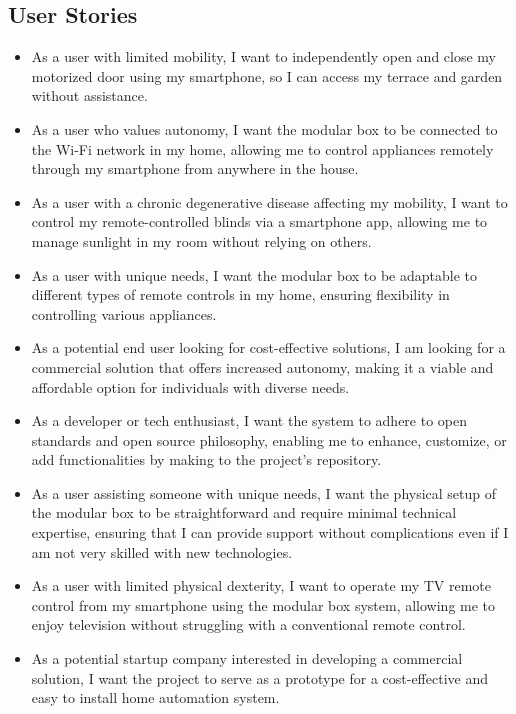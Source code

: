 \subsection{User Stories}

\begin{itemize}
    \item As a user with limited mobility, I want to independently open and close my motorized door using my smartphone, so I can access my terrace and garden without assistance.
    \item As a user who values autonomy, I want the modular box to be connected to the Wi-Fi network in my home, allowing me to control appliances remotely through my smartphone from anywhere in the house.
    \item As a user with a chronic degenerative disease affecting my mobility, I want to control my remote-controlled blinds via a smartphone app, allowing me to manage sunlight in my room without relying on others.
    \item As a user with unique needs, I want the modular box to be adaptable to different types of remote controls in my home, ensuring flexibility in controlling various appliances.
    \item As a potential end user looking for cost-effective solutions, I am looking for a commercial solution that offers increased autonomy, making it a viable and affordable option for individuals with diverse needs.
    \item As a developer or tech enthusiast, I want the system to adhere to open standards and open source philosophy, enabling me to enhance, customize, or add functionalities by making  to the project's repository.
    \item As a user assisting someone with unique needs, I want the physical setup of the modular box to be straightforward and require minimal technical expertise, ensuring that I can provide support without complications even if I am not very skilled with new technologies.
    \item As a user with limited physical dexterity, I want to operate my TV remote control from my smartphone using the modular box system, allowing me to enjoy television without struggling with a conventional remote control.
    \item As a potential startup company interested in developing a commercial solution, I want the project to serve as a prototype for a cost-effective and easy to install home automation system.
\end{itemize}

